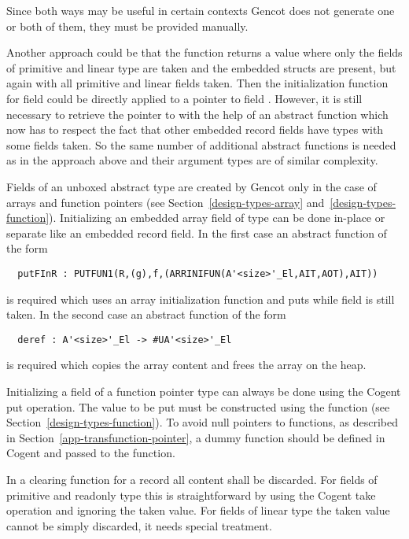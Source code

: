 Since both ways may be useful in certain contexts Gencot does not generate one or both of them, they must be provided manually.

Another approach could be that the function  returns a value where only the fields of primitive and linear type
are taken and the embedded structs are present, but again with all primitive and linear fields taken. Then the initialization function for
field  could be directly applied to a pointer to field . However, it is still necessary to retrieve the pointer to 
with the help of an abstract function which now has to respect the fact that other embedded record fields have types with
some fields taken. So the same number of additional abstract functions is needed as in the approach above and their argument
types are of similar complexity.

Fields of an unboxed abstract type are created by Gencot only in the case of arrays and function pointers (see 
Section~\ref{design-types-array} and~\ref{design-types-function}). Initializing an embedded array field  of type 
 can be done in-place or separate like an embedded record field. In the first case an abstract
function of the form 
\begin{verbatim}
  putFInR : PUTFUN1(R,(g),f,(ARRINIFUN(A'<size>'_El,AIT,AOT),AIT))
\end{verbatim}
is required which uses an array initialization function and puts  while field  is still taken. 
In the second case an abstract function of the form
\begin{verbatim}
  deref : A'<size>'_El -> #UA'<size>'_El
\end{verbatim}
is required which copies the array content and frees the array on the heap.

Initializing a field  of a function pointer type  can always be done using the Cogent put operation.
The value to be put must be constructed using the function  (see Section~\ref{design-types-function}). To
avoid null pointers to functions, as described in Section~\ref{app-transfunction-pointer}, a dummy function should be defined in
Cogent and passed to the  function.

In a clearing function for a record all content shall be discarded. For fields of primitive and readonly type this is
straightforward by using the Cogent take operation and ignoring the taken value. For fields of linear type the taken value
cannot be simply discarded, it needs special treatment.

